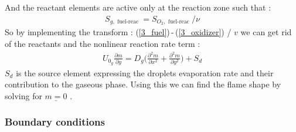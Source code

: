 \documentclass[12pt]{article}
\numberwithin{equation}{section}
\begin{document}
\begin{flushleft}
And the reactant elements are active only at the reaction zone such that :
\begin{align} 
S_{g, \text { fuel-reac }}=S_{O_{2}, \text{ fuel-reac }} / \nu
\end{align}
So by implementing the transform : (\ref{3_fuel})\,-\,(\ref{3_oxidizer}) / $v$  we can get rid of the reactants and the nonlinear reaction rate term :
\begin{align}
U_{0_g} \frac{\partial m}{\partial y}=D_{g} \Big( \frac{\partial^{2} m}{\partial x^{2}}+\frac{\partial^{2} m}{\partial y^{2}} \Big)+S_{d}
\end{align}
$S_{d}$ is the source element expressing the droplets evaporation rate and their contribution to the gaseous phase. Using this we can find the flame shape by solving for $\underline{m=0}$ .
\newpage


\subsubsection{Boundary conditions}


\end{flushleft}
\end{document}
